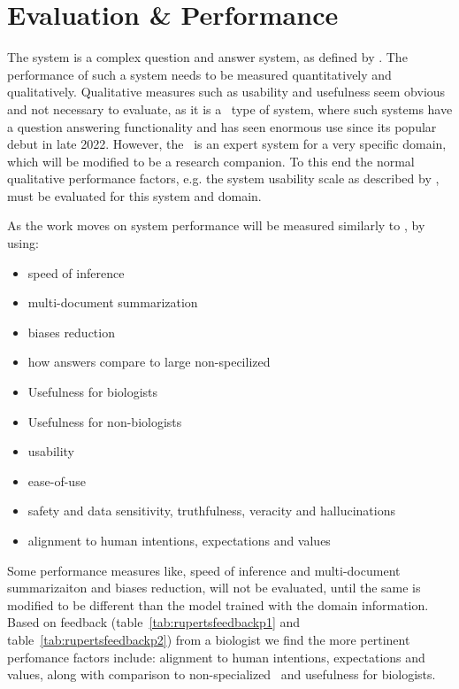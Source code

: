 \section{Evaluation \& Performance}

The system is a complex question and answer system, as defined by \cite{Daull:2023:complex}.
The performance of such a system needs to be measured quantitatively and qualitatively.
Qualitative measures such as usability and usefulness seem obvious and not necessary to evaluate, as it is a \gpts\ type of system, where such systems have a question answering functionality and has seen enormous use since its popular debut in late 2022.
However, the \project\ is an expert system for a very specific domain, which will be modified to be a research companion.
To this end the normal qualitative performance factors, e.g. the system usability scale as described by \cite{Blattgerste:2022}, must be evaluated for this system and domain.


As the work moves on system performance will be measured similarly to \cite{Daull:2023:complex}, by using:
\begin{itemize}
    \item speed of inference
    \item multi-document summarization
    \item biases reduction
    \item how answers compare to large non-specilized \llms\
    \item Usefulness for biologists
    \item Usefulness for non-biologists
    \item usability
    \item ease-of-use
    \item safety and data sensitivity, truthfulness, veracity and hallucinations
    \item alignment to human intentions, expectations and values
\end{itemize}

Some performance measures like, speed of inference and multi-document summarizaiton and biases reduction, will not be evaluated, until the same is modified to be different than the model trained with the domain information.
Based on feedback (table~\ref{tab:rupertsfeedbackp1} and table~\ref{tab:rupertsfeedbackp2}) from a biologist we find the more pertinent perfomance factors include: alignment to human intentions, expectations and values, along with comparison to non-specialized \llms\, and usefulness for biologists.

